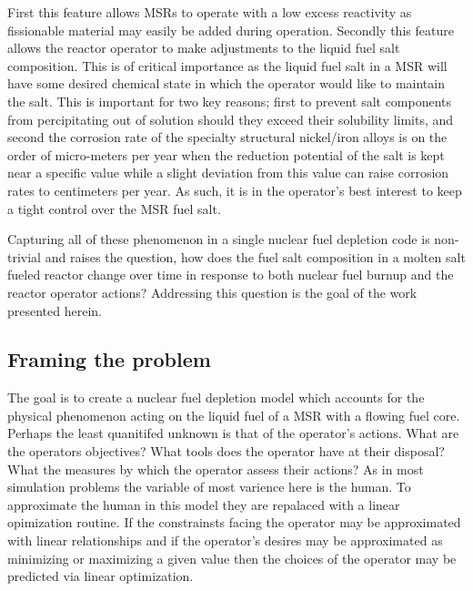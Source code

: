First this feature allows MSRs to operate with a
low excess reactivity as fissionable material may easily be added during
operation. Secondly this feature allows the reactor operator to make adjustments
to the liquid fuel salt composition. This is of critical importance as the 
liquid fuel salt in a MSR will have some desired chemical state
in which the operator would like to maintain the salt. This is important for two
key reasons; first to prevent salt components from percipitating out of solution
should they exceed their solubility limits, and second the corrosion rate of the
specialty structural nickel/iron alloys is on the order of
micro-meters per year when the reduction potential of the salt is kept near
a specific value while a slight deviation from this value can raise corrosion
rates to centimeters per year. As such, it is in the operator's best interest to
keep a tight control over the MSR fuel salt.

Capturing all of these phenomenon in a single nuclear fuel depletion code is
non-trivial and raises the question, how does the fuel salt composition in a 
molten salt fueled reactor change over time in response to both nuclear fuel
burnup and the reactor operator actions? Addressing this question is the goal
of the work presented herein.

\subsection{Framing the problem}

The goal is to create a nuclear fuel depletion model which accounts for the
physical phenomenon acting on the liquid fuel of a MSR with a flowing fuel core.
Perhaps the least quanitifed unknown is that of the operator's actions. What are
the operators objectives? What tools does the operator have at their disposal?
What the measures by which the operator assess their actions? As in most
simulation problems the variable of most varience here is the human. To
approximate the human in this model they are repalaced with a linear opimization
routine. If the constrainsts facing the operator may be approximated with linear relationships and if the operator's desires may be approximated as minimizing
or maximizing a given value then the choices of the operator may be predicted
via linear optimization.

